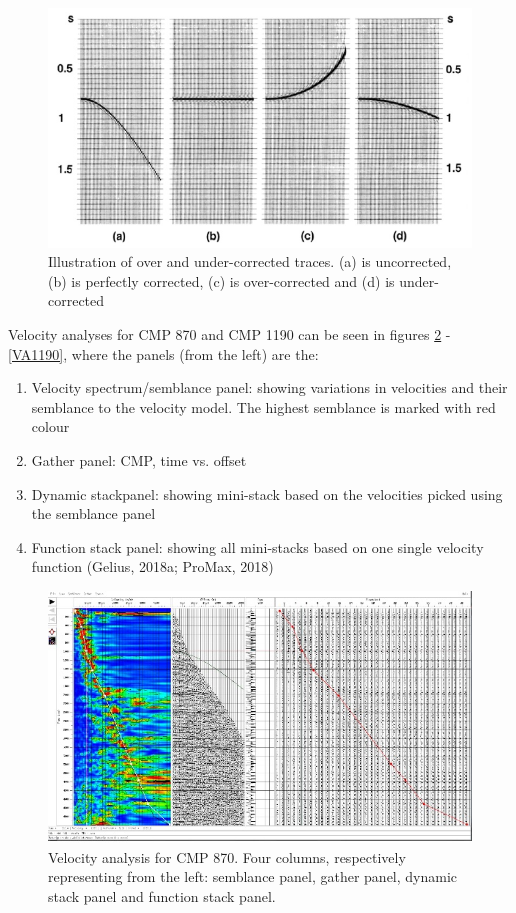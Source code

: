 \documentclass[10pt,a4paper]{article}
\begin{document}
\begin{figure}[H]
\includegraphics[width=\textwidth]{NMOcorr_over_under.jpg}
\caption{Illustration of over and under-corrected traces. (a) is uncorrected, (b) is perfectly corrected, (c) is over-corrected and (d) is under-corrected}
\label{NMOoverunder}
\end{figure}

\noindent Velocity analyses for CMP 870 and CMP 1190 can be seen in figures \ref{VA870} - \ref{VA1190}, where the panels (from the left) are the:

\begin{enumerate}
    \item Velocity spectrum/semblance panel: showing variations in velocities and their semblance to the velocity model. The highest semblance is marked with red colour
    \item Gather panel: CMP, time vs. offset
    \item Dynamic stackpanel: showing mini-stack based on the velocities picked using the semblance panel
    \item Function stack panel: showing all mini-stacks based on one single velocity function (Gelius, 2018a; ProMax, 2018)
\end{enumerate}

\begin{figure}[H]
\includegraphics[width=\textwidth]{Velo_anal_870.jpg}
\caption{Velocity analysis for CMP 870. Four columns, respectively representing from the left: semblance panel, gather panel, dynamic stack panel and function stack panel.}
\label{VA870}
\end{figure}
\end{document}
